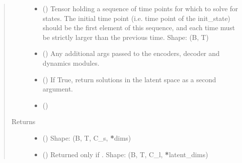 \documentclass[letterpaper,10pt,english]{sphinxmanual}
\begin{document}
\begin{fulllineitems}
\begin{fulllineitems}
\begin{quote}
\begin{description}
\begin{itemize}
\item {} 
 () \textendash{} Tensor holding a sequence of time points for which to solve for states.
The initial time point (i.e. time point of the init\_state) should be the first
element of this sequence, and each time must be strictly larger than the previous time.
Shape: (B, T)

\item {} 
 () \textendash{} Any additional args passed to the encoders, decoder and dynamics modules.

\item {} 
 () \textendash{} If True, return solutions in the latent space as a second argument.

\item {} 
 () \textendash{} 

\end{itemize}

\item[{Returns}] \leavevmode
\begin{itemize}
\item {} 
 () \textendash{} Shape: (B, T, C\_s, {\color{red}\bfseries{}*}dims)

\item {} 
 () \textendash{} Returned only if .
Shape: (B, T, C\_l, {\color{red}\bfseries{}*}latent\_dims)

\end{itemize}


\end{description}\end{quote}

\end{fulllineitems}



\end{fulllineitems}
\end{document}
